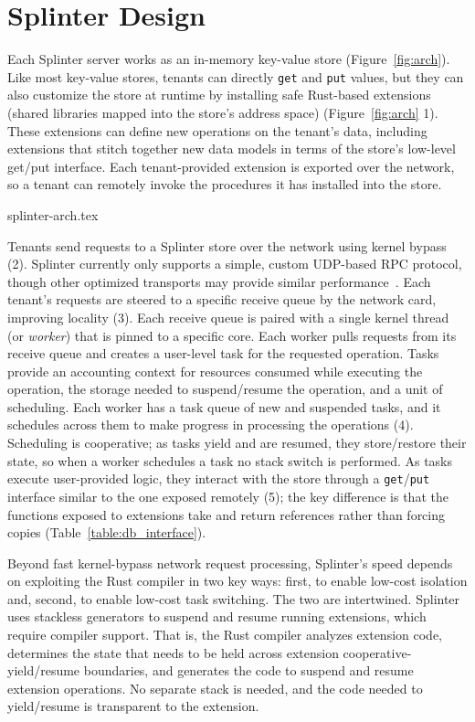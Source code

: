 \section{Splinter Design}
\label{sec:design}

Each Splinter server works as an in-memory key-value store
  (Figure~\ref{fig:arch}).
Like most key-value stores, tenants can directly \texttt{get} and \texttt{put} values, but they can also customize the
  store at runtime by installing safe Rust-based extensions (shared libraries mapped into the store's address space) (Figure~\ref{fig:arch} \textcircled{\footnotesize{1}}).
These extensions can define new operations on the tenant's data, including
  extensions that stitch together new data models in terms of the store's
  low-level get/put interface.
Each tenant-provided extension is exported over the network, so
  a tenant can remotely invoke the procedures it has installed into the store.

 {splinter-arch.tex}

Tenants send requests to a Splinter store over the
  network using kernel bypass (\textcircled{\footnotesize{2}}).
Splinter currently only supports a simple, custom UDP-based RPC
  protocol, though other optimized transports may provide similar performance~\cite{erpc-arxiv}.
Each tenant's requests are steered to a specific receive queue by the
network
  card, improving locality (\textcircled{\footnotesize{3}}).
Each receive queue is paired with a single kernel thread (or {\sl worker}) that is pinned to a specific core.
Each worker pulls requests from its receive queue and creates a
user-level task for the requested operation.
Tasks provide an accounting
context for resources consumed while executing the
  operation, the storage needed to suspend/resume the
  operation, and a unit of scheduling.
Each worker has a task queue of new and suspended tasks, and it
  schedules across them to make progress in processing the operations
  (\textcircled{\footnotesize{4}}).
Scheduling is cooperative; as tasks yield and are resumed, they
store/restore their state, so when a worker
  schedules a task no stack switch is performed.
As tasks execute user-provided logic, they interact with the store through
  a \texttt{get}/\texttt{put} interface similar to the one exposed
  remotely (\textcircled{\footnotesize{5}});
the key difference is that the functions exposed to extensions
  take and return references rather than forcing copies (Table~\ref{table:db_interface}).

Beyond fast kernel-bypass network request processing, Splinter's speed depends on exploiting
  the Rust compiler in two key ways: first, to enable low-cost
  isolation and, second, to enable low-cost task switching.
The two are intertwined.
Splinter uses stackless generators to suspend and resume running
  extensions, which require compiler support.
That is, the Rust compiler analyzes extension code, determines the state that
  needs to be held across extension cooperative-yield/resume boundaries, and generates the
  code to suspend and resume extension operations.
No separate stack is needed, and the code needed to yield/resume is transparent
  to the extension.

